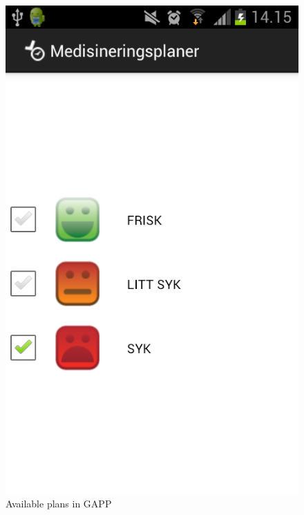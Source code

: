 \begin{figure}
\begin{minipage}[b]{0.4\linewidth}
		\centering
		\includegraphics[width=0.20\paperwidth]{Pictures/Screenshots/gapp_view_plans.png}
	\caption{Available plans in GAPP}
	\label{fig:gapp-view-plans}
	\end{minipage}
\end{figure}

